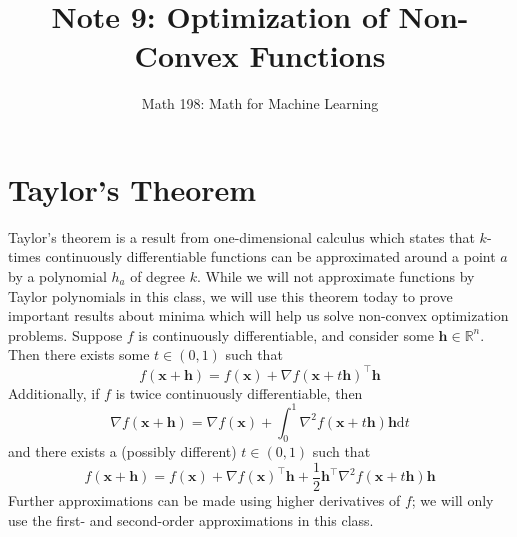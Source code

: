 \documentclass{article}
\title{Note 9: Optimization of Non-Convex Functions}
\author{Math 198: Math for Machine Learning}
\date{}
\begin{document}
\maketitle

\section{Taylor's Theorem}
Taylor's theorem is a result from one-dimensional calculus which states that $k$-times continuously differentiable functions can be approximated around a point $a$ by a polynomial $h_a$ of degree $k$. While we will not approximate functions by Taylor polynomials in this class, we will use this theorem today to prove important results about minima which will help us solve non-convex optimization problems. Suppose $f$ is continuously differentiable, and consider some $\mathbf{h} \in \mathbb{R}^n$. Then there exists some $t \in (0, 1)$ such that $$f(\mathbf{x + h}) = f(\mathbf{x}) + \nabla f(\mathbf{x} + t\mathbf{h})^\top\mathbf{h}$$ Additionally, if $f$ is twice continuously differentiable, then $$\nabla f(\mathbf{x + h}) = \nabla f(\mathbf{x}) + \int_0^1 \nabla^2 f(\mathbf{x} + t\mathbf{h})\mathbf{h} \text{d}t$$ and there exists a (possibly different) $t \in (0, 1)$ such that $$f(\mathbf{x + h}) = f(\mathbf{x}) + \nabla f(\mathbf{x})^\top\mathbf{h} + \frac{1}{2}\mathbf{h}^\top\nabla^2 f(\mathbf{x} + t\mathbf{h})\mathbf{h}$$
Further approximations can be made using higher derivatives of $f$; we will only use the first- and second-order approximations in this class.
\end{document}
